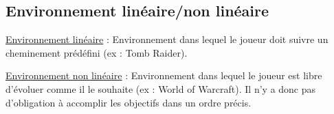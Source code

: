 \subsection*{Environnement linéaire/non linéaire}

\underline{Environnement linéaire} : 
Environnement dans lequel le joueur doit suivre un cheminement prédéfini (ex : Tomb Raider).

\underline{Environnement non linéaire} : 
Environnement dans lequel le joueur est libre d'évoluer comme il le souhaite (ex : World of Warcraft). 
Il n'y a donc pas d'obligation à accomplir les objectifs dans un ordre précis.
